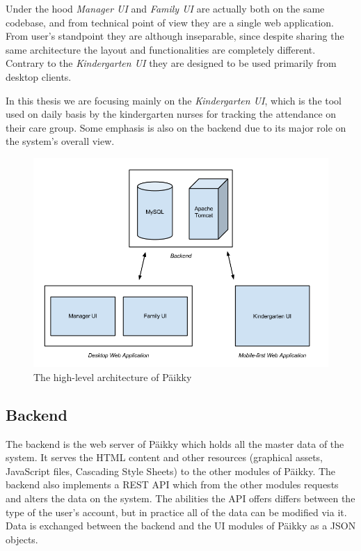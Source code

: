 Under the hood \textit{Manager UI} and \textit{Family UI} are actually both on the same codebase, and from technical point of view they are a single web application. From user's standpoint they are although inseparable, since despite sharing the same architecture the layout and functionalities are completely different. Contrary to the \textit{Kindergarten UI} they are designed to be used primarily from desktop clients. 

In this thesis we are focusing mainly on the \textit{Kindergarten UI}, which is the tool used on daily basis by the kindergarten nurses for tracking the attendance on their care group. Some emphasis is also on the backend due to its major role on the system's overall view.

\begin{figure}[t]
\begin{center}
\includegraphics[width=1\textwidth]{assets/architecture.png}
\end{center}
\caption{The high-level architecture of Päikky}
\label{fig:architecture}
\end{figure}



\subsection{Backend}

The backend is the web server of Päikky which holds all the master data of the system. It serves the HTML content and other resources (graphical assets, JavaScript files, Cascading Style Sheets) to the other modules of Päikky. The backend also implements a REST API which from the other modules requests and alters the data on the system. The abilities the API offers differs between the type of the user's account, but in practice all of the data can be modified via it. Data is exchanged between the backend and the UI modules of Päikky as a JSON objects.

